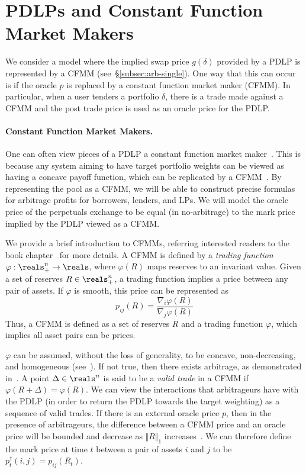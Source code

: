 \section{PDLPs and Constant Function Market Makers}\label{app:CFMM}
We consider a model where the implied swap price $g(\delta)$ provided by a PDLP is represented by a CFMM (see~\S\ref{subsec:arb-single}).
One way that this can occur is if the oracle $p$ is replaced by a constant function market maker (CFMM).
In particular, when a user tenders a portfolio $\delta$, there is a trade made against a CFMM and the post trade price is used as an oracle price for the PDLP.

\paragraph{Constant Function Market Makers.}
One can often view pieces of a PDLP a constant function market maker~\cite{angeris2020improved, angeris2023replicating}.
This is because any system aiming to have target portfolio weights can be viewed as having a concave payoff function, which can be replicated by a CFMM~\cite{angeris2023replicating}.
By representing the pool as a CFMM, we will be able to construct precise formulas for arbitrage profits for borrowers, lenders, and LPs.
We will model the oracle price of the perpetuals exchange to be equal (in no-arbitrage) to the mark price implied by the PDLP viewed as a CFMM.

We provide a brief introduction to CFMMs, referring interested readers to the book chapter~\cite{angeris2023replicating} for more details.
A CFMM is defined by a \emph{trading function} $\varphi : \reals^n_+ \rightarrow \reals$, where $\varphi(R)$ maps reserves to an invariant value.
Given a set of reserves $R \in \reals^n_+$, a trading function implies a price between any pair of assets.
If $\varphi$ is smooth, this price can be represented as~\cite[\S2.5]{angeris2023replicating}
\[
p_{ij}(R) = \frac{\nabla_i \varphi(R)}{\nabla_j \varphi(R)}
\]
Thus, a CFMM is defined as a set of reserves $R$ and a trading function $\varphi$, which implies all asset pairs can be prices.

$\varphi$ can be assumed, without the loss of generality, to be concave, non-decreasing, and homogeneous (see~\cite{angeris2023geometry, angeris2023replicating}).
If not true, then there exists arbitrage, as demonstrated in~\cite{angeris2020improved, angeris2023geometry}.
A point $\Delta \in \reals^n$ is said to be a \emph{valid trade} in a CFMM if $\varphi(R + \Delta) = \varphi(R)$.
We can view the interactions that arbitrageurs have with the PDLP (in order to return the PDLP towards the target weighting) as a sequence of valid trades.
If there is an external oracle price $p$, then in the presence of arbitrageurs, the difference between a CFMM price and an oracle price will be bounded and decrease as $\Vert R \Vert_1$ increases~\cite{angeris2020improved}.
We can therefore define the mark price at time $t$ between a pair of assets $i$ and $j$ to be $p^{\dagger}_t(i,j) = p_{ij}(R_t)$.

